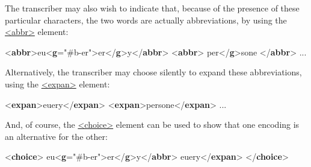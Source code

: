 The transcriber may also wish to indicate that, because of the presence of these particular characters, the two words are actually abbreviations, by using the \hyperref[TEI.abbr]{<abbr>} element: \par\bgroup{}\exampleFont \begin{shaded}\noindent\mbox{}{<\textbf{abbr}>}eu{<\textbf{g}\hspace*{1em}{ref}="{\#b-er}">}er{</\textbf{g}>}y{</\textbf{abbr}>}\mbox{}\newline 
{<\textbf{abbr}>}\mbox{}\newline 
{}per{</\textbf{g}>}sone\mbox{}\newline 
{</\textbf{abbr}>} ... \end{shaded}\egroup\par \noindent  Alternatively, the transcriber may choose silently to expand these abbreviations, using the \hyperref[TEI.expan]{<expan>} element: \par\bgroup{}\exampleFont \begin{shaded}\noindent\mbox{}{<\textbf{expan}>}euery{</\textbf{expan}>}\mbox{}\newline 
{<\textbf{expan}>}persone{</\textbf{expan}>} ... \end{shaded}\egroup\par \noindent  And, of course, the \hyperref[TEI.choice]{<choice>} element can be used to show that one encoding is an alternative for the other: \par\bgroup{}\exampleFont \begin{shaded}\noindent\mbox{}{<\textbf{choice}>}\mbox{}\newline 
{}eu{<\textbf{g}\hspace*{1em}{ref}="{\#b-er}">}er{</\textbf{g}>}y{</\textbf{abbr}>}\mbox{}\newline 
{}euery{</\textbf{expan}>}\mbox{}\newline 
{</\textbf{choice}>}\end{shaded}\egroup\par \par

